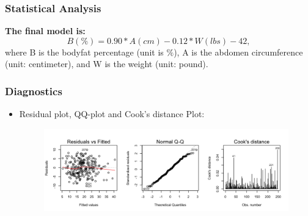 \documentclass{beamer}
\begin{document}
\begin{frame}
\frametitle{Statistical Analysis}

\textbf{The final model is:}
$$B(\%) = 0.90*A (cm) - 0.12*W (lbs) - 42,$$
 where B is the bodyfat percentage (unit is $\%$), A is the abdomen circumference (unit: centimeter), and W is the weight (unit: pound).


\end{frame}

\begin{frame}
\frametitle{Diagnostics}
\begin{itemize}
	\item Residual plot, QQ-plot and Cook's distance Plot:
	\begin{figure}
		\includegraphics[width=1\linewidth]{Diagnostics.png}
	\end{figure}
\end{itemize}
\end{frame}



\end{document}
